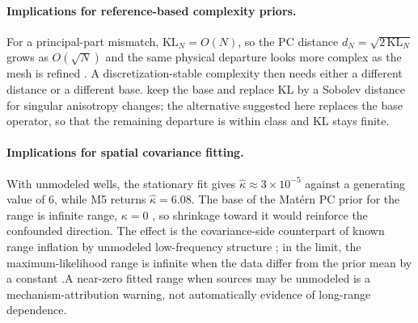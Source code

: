 \documentclass[11pt]{article}
\numberwithin{table}{section}
\numberwithin{figure}{section}
\begin{document}
\paragraph{Implications for reference-based complexity priors.}
For a principal-part mismatch, $\mathrm{KL}_N=O(N)$, so the PC distance $d_N=\sqrt{2\,\mathrm{KL}_N}$ grows as $O(\sqrt N)$ and the same physical departure looks more complex as the mesh is refined \citep{Simpson2017,Fuglstad2019}. A discretization-stable complexity then needs either a different distance or a different base. \citet{LlamazaresElias2026} keep the base and replace KL by a Sobolev distance for singular anisotropy changes; the alternative suggested here replaces the base operator, so that the remaining departure is within class and KL stays finite.

\paragraph{Implications for spatial covariance fitting.}
With unmodeled wells, the stationary fit gives $\widehat\kappa\approx3\times10^{-5}$ against a generating value of $6$, while M5 returns $\widehat\kappa=6.08$. The base of the Mat\'ern PC prior for the range is infinite range, $\kappa=0$ \citep{Fuglstad2019}, so shrinkage toward it would reinforce the confounded direction. The effect is the covariance-side counterpart of known range inflation by unmodeled low-frequency structure \citep[Sec.~3.2]{Bose2018}; in the limit, the maximum-likelihood range is infinite when the data differ from the prior mean by a constant \citep[Thm.~2.3]{KarvonenOates2023}.A near-zero fitted range when sources may be unmodeled is a mechanism-attribution warning, not automatically evidence of long-range dependence.
\end{document}
